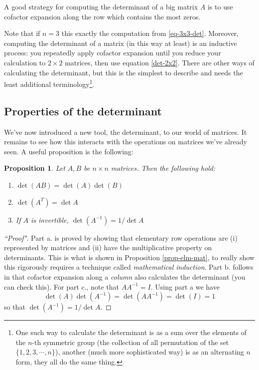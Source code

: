 \documentclass[12pt]{article}
\numberwithin{equation}{subsection}
\numberwithin{figure}{subsection}
\newtheorem{prop}[subsection]{Proposition}
\theoremstyle{note}
\begin{document}
A good strategy for computing the determinant of a big matrix $A$ is to use cofactor expansion along the row which contains the most zeros. 

Note that if $n=3$ this exactly the computation from \eqref{eq-3x3-det}. Moreover, computing the determinant of a matrix (in this way at least) is an inductive process: you repeatedly apply cofactor expansion until you reduce your calculation to $2\times 2$ matrices, then use equation \eqref{det-2x2}. There are other ways of calculating the determinant, but this is the simplest to describe and needs the least additional terminology\footnote{One such way to calculate the determinant is as a sum over the elements of the $n$-th symmetric group (the collection of all permutation of the set $\{1,2,3,\cdots, n\}$), another (much more sophisticated way) is as an alternating $n$ form, they all do the same thing.}.

\subsection{Properties of the determinant}
We've now introduced a new tool, the determinant, to our world of matrices. It remains to see how this interacts with the operations on matrices we've already seen. A useful proposition is the following:

\begin{prop}
Let $A,B$ be $n\times n$ matrices. Then the following hold:
\begin{enumerate}
	\item $\det(AB)=\det(A)\det(B)$
	\item $\det(A^T)=\det A$
	\item If $A$ is invertible, $\det(A^{-1})=1/\det A$
\end{enumerate}
\end{prop}
\begin{proof}[``Proof"]
Part a. is proved by showing that elementary row operations are (i) represented by matrices and (ii) have the multiplicative property on determinants. This is what is shown in Proposition \ref{prop-elm-mat}, to really show this rigorously requires a technique called \textit{mathematical induction}. Part b. follows in that cofactor expansion along a \textit{column} also calculates the determinant (you can check this). For part c., note that $AA^{-1}=I$. Using part a we have \[\det(A)\det(A^{-1})=\det(AA^{-1})=\det(I)=1\] so that $\det (A^{-1})=1/\det A$. 
\end{proof}
\end{document}
